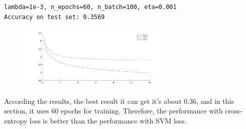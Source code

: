 \begin{verbatim}
lambda=1e-3, n_epochs=60, n_batch=100, eta=0.001
Accuracy on test set: 0.3569
\end{verbatim}

\begin{figure}[h!]
	\centering
	\includegraphics[width=0.65\textwidth]{../Result_Pics/a8.png}
\end{figure}

According the results, the best result it can get it's about 0.36, and in this section, it uses 60 epochs for training. Therefore, the performance with cross-entropy loss is better than the performance with SVM loss.




